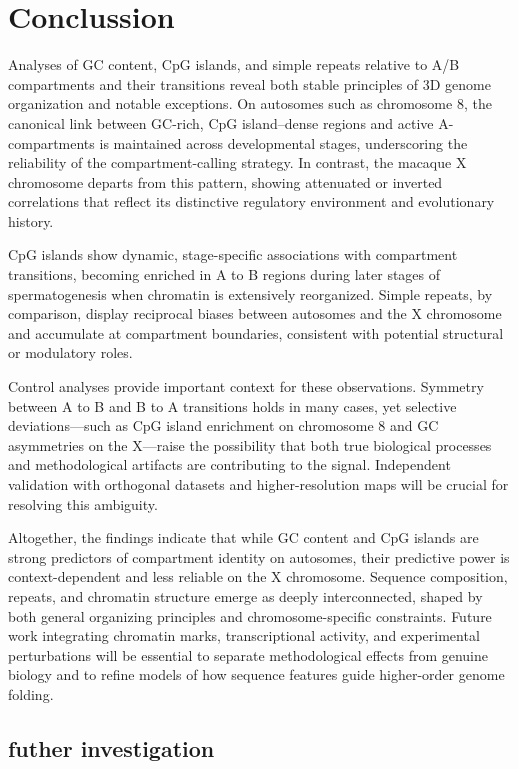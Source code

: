 \documentclass[
  a4paper,
  openany]{scrbook}
\begin{document}
\chapter{Conclussion}\label{conclussion}

Analyses of GC content, CpG islands, and simple repeats relative to A/B
compartments and their transitions reveal both stable principles of 3D
genome organization and notable exceptions. On autosomes such as
chromosome 8, the canonical link between GC-rich, CpG island--dense
regions and active A-compartments is maintained across developmental
stages, underscoring the reliability of the compartment-calling
strategy. In contrast, the macaque X chromosome departs from this
pattern, showing attenuated or inverted correlations that reflect its
distinctive regulatory environment and evolutionary history.

CpG islands show dynamic, stage-specific associations with compartment
transitions, becoming enriched in A to B regions during later stages of
spermatogenesis when chromatin is extensively reorganized. Simple
repeats, by comparison, display reciprocal biases between autosomes and
the X chromosome and accumulate at compartment boundaries, consistent
with potential structural or modulatory roles.

Control analyses provide important context for these observations.
Symmetry between A to B and B to A transitions holds in many cases, yet
selective deviations---such as CpG island enrichment on chromosome 8 and
GC asymmetries on the X---raise the possibility that both true
biological processes and methodological artifacts are contributing to
the signal. Independent validation with orthogonal datasets and
higher-resolution maps will be crucial for resolving this ambiguity.

Altogether, the findings indicate that while GC content and CpG islands
are strong predictors of compartment identity on autosomes, their
predictive power is context-dependent and less reliable on the X
chromosome. Sequence composition, repeats, and chromatin structure
emerge as deeply interconnected, shaped by both general organizing
principles and chromosome-specific constraints. Future work integrating
chromatin marks, transcriptional activity, and experimental
perturbations will be essential to separate methodological effects from
genuine biology and to refine models of how sequence features guide
higher-order genome folding.

\section{futher investigation}\label{futher-investigation}
\end{document}
